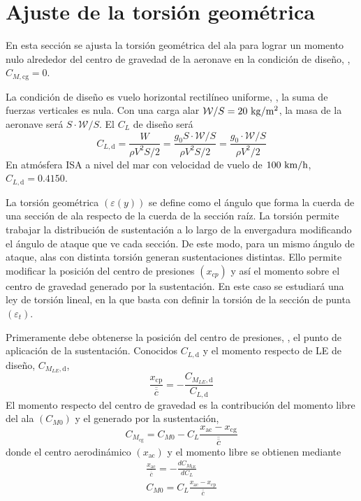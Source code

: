 
\section{Ajuste de la torsión geométrica} \label{sec:ajuste_torsion}

En esta sección se ajusta la torsión geométrica del ala para lograr un momento nulo alrededor del centro de gravedad de la aeronave en la condición de diseño, \ie, $C_{M,\text{cg}} = 0$.

La condición de diseño es vuelo horizontal rectilíneo uniforme, \ie, la suma de fuerzas verticales es nula. Con una carga alar $\mathcal{W}/S = 20 \ \kilo\gram / \meter^2$, la masa de la aeronave será $S \cdot \mathcal{W} / S$. El $C_L$ de diseño será
\begin{equation}
    C_{L,\text{d}} = \frac{W}{\rho V^2 S / 2} = 
    \frac{g_0 S \cdot \mathcal{W} / S}{\rho V^2 S / 2} = 
    \frac{g_0 \cdot \mathcal{W} / S}{\rho V^2 / 2}
\end{equation}
En atmósfera ISA a nivel del mar con velocidad de vuelo de $100 \ \kilo\meter / \hour$, $C_{L,\text{d}} = 0.4150$. 

La torsión geométrica $\left( \varepsilon(y) \right)$ se define como el ángulo que forma la cuerda de una sección de ala respecto de la cuerda de la sección raíz. La torsión permite trabajar la distribución de sustentación a lo largo de la envergadura modificando el ángulo de ataque que ve cada sección. De este modo, para un mismo ángulo de ataque, alas con distinta torsión generan sustentaciones distintas. Ello permite modificar la posición del centro de presiones $\left( x_{cp} \right)$ y así el momento sobre el centro de gravedad generado por la sustentación. En este caso se estudiará una ley de torsión lineal, en la que basta con definir la torsión de la sección de punta $\left( \varepsilon_t \right)$. 

Primeramente debe obtenerse la posición del centro de presiones, \ie, el punto de aplicación de la sustentación. Conocidos $C_{L,\text{d}}$ y el momento respecto de LE de diseño, $C_{M_{LE}, \text{d}}$,
\begin{equation} \label{eq:calculo_xcp}
    \frac{x_\text{cp}}{\overline{\overline{c}}} = 
    - \frac{C_{M_{LE}, \text{d}}}{C_{L,\text{d}}}
\end{equation}
El momento respecto del centro de gravedad es la contribución del momento libre del ala $\left( C_{M0} \right)$ y el generado por la sustentación,
\begin{equation} \label{eq:calculo_cmcg}
    C_{M_\text{cg}} = 
    C_{M0} - C_L \frac{x_\text{ac} - x_\text{cg}}{\overline{\overline{c}}}
\end{equation}
donde el centro aerodinámico $\left( x_\text{ac} \right)$ y el momento libre se obtienen mediante
\begin{gather}
    \frac{x_\text{ac}}{\overline{\overline{c}}} = 
    - \frac{d C_{M_\text{LE}}}{d C_L} \\
    C_{M0} = C_L \frac{x_\text{ac} - x_\text{cp}}{\overline{\overline{c}}} \label{eq:calculo_CM0}
\end{gather}

